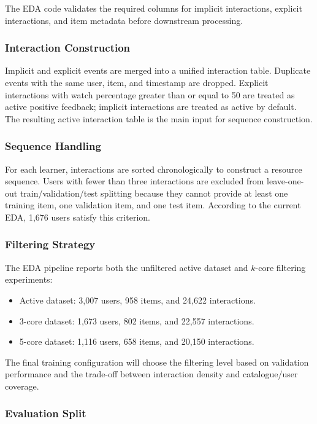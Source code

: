 The EDA code validates the required columns for implicit interactions, explicit interactions, and item metadata before downstream processing.

\subsubsection{Interaction Construction}

Implicit and explicit events are merged into a unified interaction table. Duplicate events with the same user, item, and timestamp are dropped. Explicit interactions with watch percentage greater than or equal to 50 are treated as active positive feedback; implicit interactions are treated as active by default. The resulting active interaction table is the main input for sequence construction.

\subsubsection{Sequence Handling}

For each learner, interactions are sorted chronologically to construct a resource sequence. Users with fewer than three interactions are excluded from leave-one-out train/validation/test splitting because they cannot provide at least one training item, one validation item, and one test item. According to the current EDA, 1,676 users satisfy this criterion.

\subsubsection{Filtering Strategy}

The EDA pipeline reports both the unfiltered active dataset and $k$-core filtering experiments:

\begin{itemize}
    \item Active dataset: 3,007 users, 958 items, and 24,622 interactions.
    \item 3-core dataset: 1,673 users, 802 items, and 22,557 interactions.
    \item 5-core dataset: 1,116 users, 658 items, and 20,150 interactions.
\end{itemize}

The final training configuration will choose the filtering level based on validation performance and the trade-off between interaction density and catalogue/user coverage.

\subsubsection{Evaluation Split}

